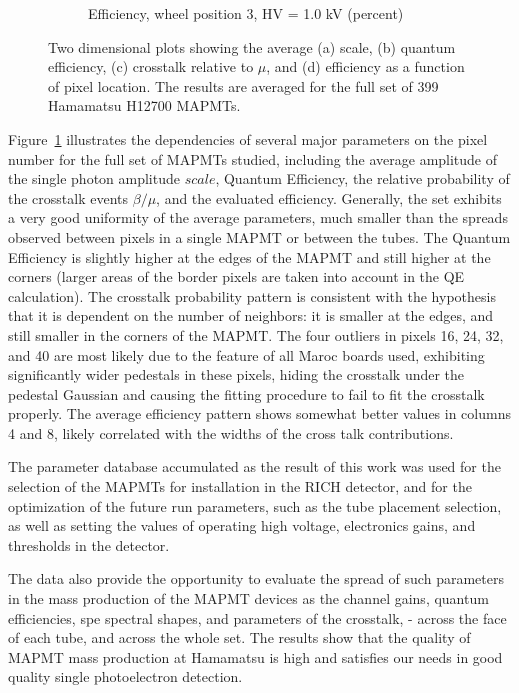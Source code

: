 \begin{figure}[t!]
\begin{subfigure}[c]{0.48\linewidth}
		\caption{Efficiency, wheel position 3, HV = 1.0 kV (percent)}
		\vspace{0mm}
	\end{subfigure}%
	\caption{Two dimensional plots showing the average (a) scale, (b) quantum efficiency, (c) crosstalk relative to $\mu$, and (d) efficiency as a function of pixel location. The results are averaged for the full set of 399 Hamamatsu H12700 MAPMTs.}
	\label{fig:2d_avg_fit_results}
\end{figure}


Figure~\ref{fig:2d_avg_fit_results} illustrates the dependencies of several major parameters on the pixel number for the full set of MAPMTs studied, including the average amplitude of the single photon amplitude $scale$, Quantum Efficiency, the relative probability of the crosstalk events $\beta/\mu$, and the evaluated efficiency. Generally, the set exhibits a very good uniformity of the average parameters, much smaller than the spreads observed between pixels in a single MAPMT or between the tubes. The Quantum Efficiency is slightly higher at the edges of the MAPMT and still higher at the corners (larger areas of the border pixels are taken into account in the QE calculation). The crosstalk probability pattern is consistent with the hypothesis that it is dependent on the number of neighbors: it is smaller at the edges, and still smaller in the corners of the MAPMT. The four outliers in pixels 16, 24, 32, and 40 are most likely due to the feature of all Maroc boards used, exhibiting significantly wider pedestals in these pixels, hiding the crosstalk under the pedestal Gaussian and causing the fitting procedure to fail to fit the crosstalk properly. The average efficiency pattern shows somewhat better values in columns 4 and 8, likely correlated with the widths of the cross talk contributions.    



The parameter database accumulated as the result of this work was used for the selection of the MAPMTs for installation in the RICH detector, and for the optimization of the future run parameters, such as the tube placement selection, as well as setting the values of operating high voltage, electronics gains, and thresholds in the detector.


The data also provide the opportunity to evaluate the spread of such parameters in the mass production of the MAPMT devices as the channel gains, quantum efficiencies, spe spectral shapes, and parameters of the crosstalk, - across the face of each tube, and across the whole set. The results show that the quality of MAPMT mass production at Hamamatsu is high and satisfies our needs in good quality single photoelectron detection.



